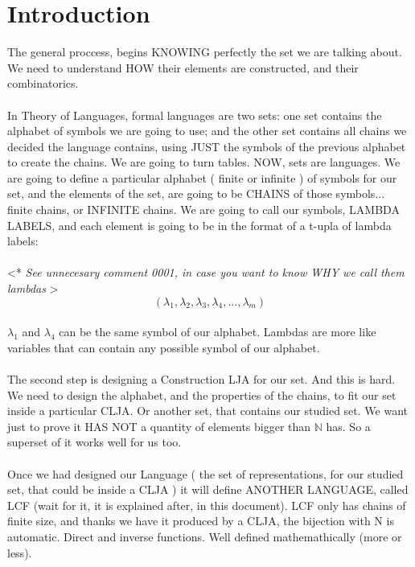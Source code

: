 \chapter{Introduction}

	\noindent
	The general proccess, begins KNOWING perfectly the set we are talking about. We need to understand HOW their elements are constructed, and their combinatorics.
	\\\\
	
	\noindent
	In Theory of Languages, formal languages are two sets: one set contains the alphabet of symbols we are going to use; and the other set contains all chains we decided the language contains, using JUST the symbols of the previous alphabet to create the chains. We are going to turn tables. NOW, sets are languages. We are going to define a particular alphabet ( finite or infinite ) of symbols for our set, and the elements of the set, are going to be CHAINS of those symbols... finite chains, or INFINITE chains. We are going to call our symbols, LAMBDA LABELS, and each element is going to be in the format of a t-upla of lambda labels:\\\\
	\textless ** \textit{See unnecesary comment 0001, in case you want to know WHY we call them lambdas} \textgreater\\
	$$ (\lambda_{1}, \lambda_{2}, \lambda_{3}, \lambda_{4}, ... , \lambda_{m}) $$\\
	$ \lambda_{1} $ and $\lambda_{4}$ can be the same symbol of our alphabet. Lambdas are more like variables that can contain any possible symbol of our alphabet.
	\\\\
	
	\noindent
	The second step is designing a Construction LJA for our set. And this is hard. We need to design the alphabet, and the properties of the chains, to fit our set inside a particular CLJA. Or another set, that contains our studied set. We want just to prove it HAS NOT a quantity of elements bigger than $\mathbb{N}$ has. So a superset of it works well for us too.
	\\\\
	
	\noindent
	Once we had designed our Language ( the set of representations, for our studied set, that could be inside a CLJA ) it will define ANOTHER LANGUAGE, called LCF (wait for it, it is explained after, in this document). LCF only has chains of finite size, and thanks we have it produced by a CLJA, the bijection with N is automatic. Direct and inverse functions. Well defined mathemathically (more or less).
	\\\\
	
